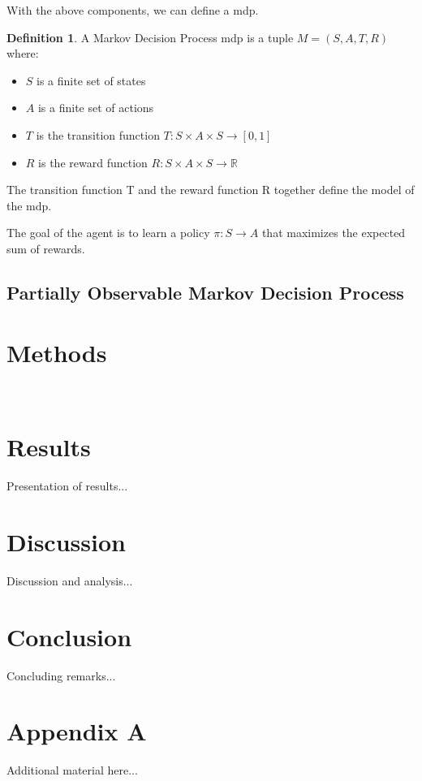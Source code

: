 \documentclass[a4paper,11pt]{report}
\theoremstyle{definition}
\newtheorem{definition}{Definition}[section]
\theoremstyle{plain}
\begin{document}
With the above components, we can define a \gls{mdp}.

\begin{definition}
A Markov Decision Process \gls{mdp} is a tuple $M = (S, A, T, R)$ where:
\begin{itemize}
    \setlength\itemsep{0.01em}
    \item $S$ is a finite set of states
    \item $A$ is a finite set of actions
    \item $T$ is the transition function $T : S \times A \times S \rightarrow [0,1]$
    \item $R$ is the reward function $R : S \times A \times S \rightarrow \mathbb{R}$
\end{itemize}
\end{definition}
The transition function T and the reward function R together define the model of
the \gls{mdp}.

The goal of the agent is to learn a policy $\pi : S \rightarrow A$ that maximizes the expected sum of rewards.



\section{Partially Observable Markov Decision Process}
\cite{Loisy_2022}

\chapter{Methods}
\
\chapter{Results}
Presentation of results...

\chapter{Discussion}
Discussion and analysis...

\chapter{Conclusion}
Concluding remarks...

\printbibliography

% 
% 

\appendix
\chapter{Appendix A}
Additional material here...
\end{document}
